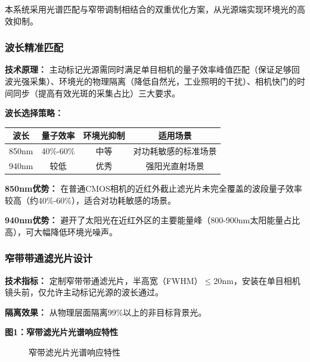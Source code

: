 \documentclass[12pt, a4paper]{ctexart}
\begin{document}
本系统采用光谱匹配与窄带调制相结合的双重优化方案，从光源端实现环境光的高效抑制。

\subsubsection{波长精准匹配}

\textbf{技术原理：} 主动标记光源需同时满足单目相机的量子效率峰值匹配（保证足够回波光强采集）、环境光的物理隔离（降低自然光，工业照明的干扰）、相机快门的时间同步（提高有效光斑的采集占比）三大要求。

\textbf{波长选择策略：}

\begin{tabular}{cccc}
\toprule
波长 & 量子效率 & 环境光抑制 & 适用场景 \\
\midrule
850nm & 40\%-60\% & 中等 & 对功耗敏感的标准场景 \\
940nm & 较低 & 优秀 & 强阳光直射场景 \\
\bottomrule
\end{tabular}

\bigskip

\textbf{850nm优势：} 在普通CMOS相机的近红外截止滤光片未完全覆盖的波段量子效率较高（约40\%-60\%），适合对功耗敏感的场景。

\textbf{940nm优势：} 避开了太阳光在近红外区的主要能量峰（800-900nm太阳能量占比高），可大幅降低环境光噪声。

\subsubsection{窄带带通滤光片设计}

\textbf{技术指标：} 定制窄带带通滤光片，半高宽（FWHM）$\le$20nm，安装在单目相机镜头前，仅允许主动标记光源的波长通过。

\textbf{隔离效果：} 从物理层面隔离99\%以上的非目标背景光。

\textbf{图1：窄带滤光片光谱响应特性}

\begin{figure}[htbp]
\centering
{}
\caption{窄带滤光片光谱响应特性}\label{fig:filter}
\end{figure}
\end{document}
